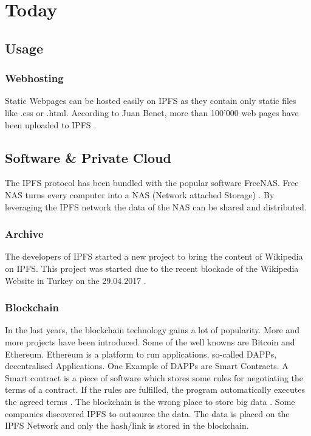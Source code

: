 \documentclass[a4paper,11pt, oneside]{report}
\theoremstyle{definition}
\begin{document}
\newpage
\chapter{Today}

\section{Usage}
\subsection{Webhosting}
Static Webpages can be hosted easily on IPFS as they contain only static files like .css or .html.
According to Juan Benet, more than 100'000 web pages have been uploaded to IPFS \cite{ipfs-usage-web}.
\section{Software \& Private Cloud}
The IPFS protocol has been bundled with the popular software FreeNAS. Free NAS turns every computer into a NAS (Network attached Storage) \cite{freenas}. By leveraging the IPFS network the data of the NAS can be shared and distributed.

\subsection{Archive}
The developers of IPFS started a new project to bring the content of Wikipedia on IPFS. This project was started due to the recent blockade of the Wikipedia Website in Turkey on the 29.04.2017 \cite{turkeyblock}.

\subsection{Blockchain}
In the last years, the blockchain technology gains a lot of popularity. More and more projects have been introduced. Some of the well knowns are Bitcoin and Ethereum. Ethereum is a platform to run applications, so-called DAPPs, decentralised Applications. One Example of DAPPs are Smart Contracts. A Smart contract is a piece of software which stores some rules for negotiating the terms of a contract. If the rules are fulfilled, the program automatically executes the agreed terms \cite{ether}. The blockchain is the wrong place to store big data \cite{blockchain-data}. Some companies discovered IPFS to outsource the data. The data is placed on the IPFS Network and only the hash/link is stored in the blockchain.
\end{document}
